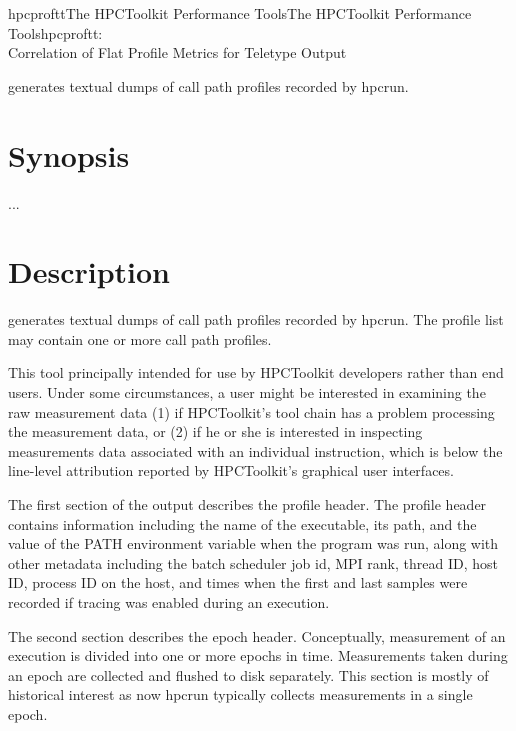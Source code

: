 \documentclass[english]{article}
\begin{document}
\begin{Name}{1}{hpcproftt}{The HPCToolkit Performance Tools}{The HPCToolkit Performance Tools}{hpcproftt:\\ Correlation of Flat Profile Metrics for Teletype Output}


 generates textual dumps of call path profiles recorded by hpcrun.

\end{Name}

\section{Synopsis}

 ...


\section{Description}

 generates textual dumps of call path profiles recorded
by hpcrun.  The profile list may contain one or more call path profiles.

This tool principally intended for use by HPCToolkit developers rather
than end users. Under some circumstances, a user might be interested in
examining the raw measurement data (1) if HPCToolkit's tool chain has a problem processing
the measurement data, or (2) if he or she is interested in inspecting
measurements data associated with an individual instruction, which is below the
line-level attribution reported by HPCToolkit's graphical user interfaces.

The first section of the output describes the profile header. The profile
header contains information including the name of the executable, its
path, and the value of the PATH environment variable when the program was
run, along with other metadata including the batch scheduler job id, MPI
rank, thread ID, host ID, process ID on the host, and times when the first
and last samples were recorded if tracing was enabled during an execution.

The second section describes the epoch header. Conceptually, measurement
of an execution is divided into one or more epochs in time. Measurements
taken during an epoch are collected and flushed to disk separately. This
section is mostly of historical interest as now hpcrun typically collects
measurements in a single epoch.
\end{document}
